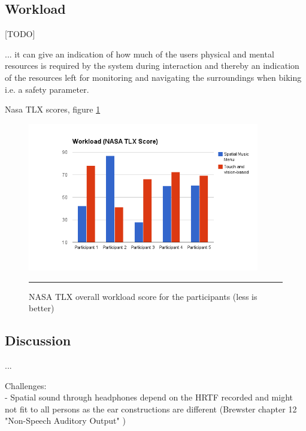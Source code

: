 \subsection{Workload}
[TODO]

... it can give an indication of how much of the users physical and mental resources is required by the system during interaction and thereby an indication of the resources left for monitoring and navigating the surroundings when biking i.e. a safety parameter.

Nasa TLX scores, figure \ref{fig:resultsnasatlx}

\begin{figure}[t]
	\centering
		\includegraphics[width=0.9\textwidth,height=\textheight,keepaspectratio]{./Figures/results_nasatlx.png}
		\rule{35em}{1pt}
	\caption[Results NASA TLX Score]{NASA TLX overall workload score for the participants (less is better)}
	\label{fig:resultsnasatlx}
\end{figure}

\subsection{Discussion}
...

Challenges:\\
- Spatial sound through headphones depend on the HRTF recorded and might not fit to all persons as the ear constructions are different (Brewster chapter 12 "Non-Speech Auditory Output" \cite{brewster_human-computer_2003})








